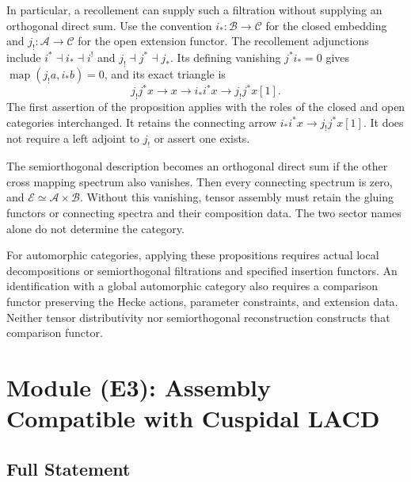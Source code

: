 In particular, a recollement can supply such a filtration without
supplying an orthogonal direct sum. Use the convention
$i_*:\mathcal B\to\mathcal C$ for the closed embedding and
$j_!:\mathcal A\to\mathcal C$ for the open extension functor.
The recollement adjunctions include $i^*\dashv i_*\dashv i^!$ and
$j_!\dashv j^*\dashv j_*$. Its defining vanishing $j^*i_*=0$ gives
$\operatorname{map}(j_!a,i_*b)=0$, and its exact triangle is
\[
 j_!j^*x\longrightarrow x\longrightarrow i_*i^*x
               \longrightarrow j_!j^*x[1].
\]
The first assertion of the proposition applies with the roles of the
closed and open categories interchanged. It retains the connecting
arrow $i_*i^*x\to j_!j^*x[1]$. It does not require a left adjoint to
$j_!$ or assert one exists.

The semiorthogonal description becomes an orthogonal direct sum if the
other cross mapping spectrum also vanishes. Then every connecting
spectrum is zero, and $\mathcal E\simeq\mathcal A\times\mathcal B$.
Without this vanishing, tensor assembly must retain the gluing functors
or connecting spectra and their composition data. The two sector names
alone do not determine the category.

For automorphic categories, applying these propositions requires actual
local decompositions or semiorthogonal filtrations and specified
insertion functors. An identification with a global automorphic category
also requires a comparison functor preserving the Hecke actions,
parameter constraints, and extension data. Neither tensor distributivity
nor semiorthogonal reconstruction constructs that comparison functor.

\section{Module (E3): Assembly Compatible with Cuspidal LACD}
\label{v4-arith:w6-d:E3}

\subsection{Full Statement}

